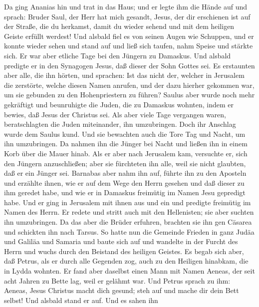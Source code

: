 Da ging Ananias hin und trat in das Haus; und er legte ihm die Hände auf
und sprach: Bruder Saul, der Herr hat mich gesandt, Jesus, der dir
erschienen ist auf der Straße, die du herkamst, damit du wieder sehend
und mit dem heiligen Geiste erfüllt werdest!  Und alsbald
fiel es von seinen Augen wie Schuppen, und er konnte wieder sehen und
stand auf und ließ sich taufen, nahm Speise und stärkte sich.
 Er war aber etliche Tage bei den Jüngern zu Damaskus.
 Und alsbald predigte er in den Synagogen Jesus, daß
dieser der Sohn Gottes sei.  Es erstaunten aber alle, die
ihn hörten, und sprachen: Ist das nicht der, welcher in Jerusalem die
zerstörte, welche diesen Namen anrufen, und der dazu hierher gekommen
war, um sie gebunden zu den Hohenpriestern zu führen? 
Saulus aber wurde noch mehr gekräftigt und beunruhigte die Juden, die zu
Damaskus wohnten, indem er bewies, daß Jesus der Christus sei.
 Als aber viele Tage vergangen waren, beratschlagten die
Juden miteinander, ihn umzubringen.  Doch ihr Anschlag
wurde dem Saulus kund. Und sie bewachten auch die Tore Tag und Nacht, um
ihn umzubringen.  Da nahmen ihn die Jünger bei Nacht und
ließen ihn in einem Korb über die Mauer hinab.  Als er
aber nach Jerusalem kam, versuchte er, sich den Jüngern anzuschließen;
aber sie fürchteten ihn alle, weil sie nicht glaubten, daß er ein Jünger
sei.  Barnabas aber nahm ihn auf, führte ihn zu den
Aposteln und erzählte ihnen, wie er auf dem Wege den Herrn gesehen und
daß dieser zu ihm geredet habe, und wie er in Damaskus freimütig im
Namen Jesu gepredigt habe.  Und er ging in Jerusalem mit
ihnen aus und ein und predigte freimütig im Namen des Herrn.
 Er redete und stritt auch mit den Hellenisten; sie aber
suchten ihn umzubringen.  Da das aber die Brüder
erfuhren, brachten sie ihn gen Cäsarea und schickten ihn nach Tarsus.
 So hatte nun die Gemeinde Frieden in ganz Judäa und
Galiläa und Samaria und baute sich auf und wandelte in der Furcht des
Herrn und wuchs durch den Beistand des heiligen Geistes. 
Es begab sich aber, daß Petrus, als er durch alle Gegenden zog, auch zu
den Heiligen hinabkam, die in Lydda wohnten.  Er fand
aber daselbst einen Mann mit Namen Aeneas, der seit acht Jahren zu Bette
lag, weil er gelähmt war.  Und Petrus sprach zu ihm:
Aeneas, Jesus Christus macht dich gesund; steh auf und mache dir dein
Bett selbst! Und alsbald stand er auf.  Und es sahen ihn
